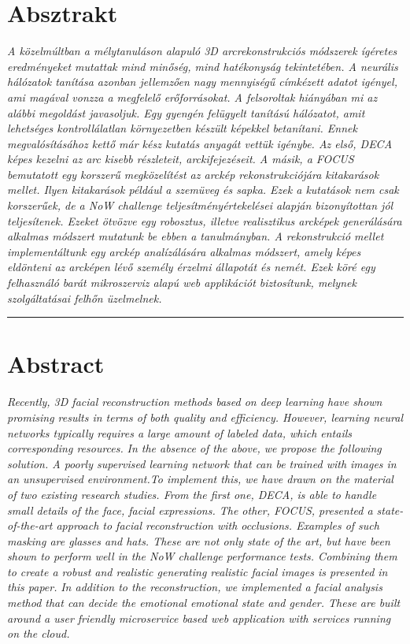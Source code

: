 \documentclass[12pt,a4]{article}
\begin{document}
	\section*{Absztrakt}
     \emph{
		A közelmúltban a mélytanuláson alapuló 3D arcrekonstrukciós módszerek
		ígéretes eredményeket mutattak mind minőség, mind hatékonyság tekintetében. A neurális hálózatok tanítása azonban jellemzően nagy mennyiségű címkézett
		adatot igényel, ami magával vonzza a megfelelő erőforrásokat.
		A felsoroltak hiányában mi az alábbi megoldást javasoljuk. Egy gyengén
		felügyelt tanítású hálózatot, amit lehetséges kontrollálatlan környezetben készült képekkel betanítani.
		Ennek megvalósításához kettő már kész kutatás anyagát vettük igénybe. Az
		első, \cite{deca}DECA képes kezelni az arc kisebb részleteit, arckifejezéseit. A
		másik, a \cite{focus}FOCUS bemutatott egy korszerű megközelítést az arckép rekonstrukciójára kitakarások mellet. Ilyen kitakarások például a szemüveg és sapka. Ezek a kutatások nem csak korszerűek, de a NoW challenge teljesítményértekelései alapján bizonyítottan jól teljesítenek. Ezeket ötvözve egy robosztus, illetve realisztikus
		arcképek generálására alkalmas módszert mutatunk be ebben a tanulmányban.
		A rekonstrukció mellet implementáltunk egy arckép analízálására alkalmas módszert, amely képes eldönteni az arcképen lévő személy érzelmi
		állapotát és nemét. Ezek köré egy felhasználó barát mikroszerviz alapú web
		applikációt biztosítunk, melynek szolgáltatásai felhőn üzelmelnek.
		}
	\par\noindent\rule{\textwidth}{0.4pt}

    \section*{Abstract}
        \textit{Recently, 3D facial reconstruction methods based on deep learning have shown promising results in terms of both quality and efficiency. However, learning neural networks typically requires a large amount of labeled data, which entails corresponding resources.
        }
        \textit{In the absence of the above, we propose the following solution. A poorly supervised learning network that can be trained with images in an unsupervised environment.To implement this, we have drawn on the material of two existing research studies. From the first one, \cite{deca}DECA, is able to handle small details of the face, facial expressions. The other, \cite{focus}FOCUS, presented a state-of-the-art approach to facial reconstruction with occlusions. Examples of such masking are glasses and hats. These are not only state of the art, but have been shown to perform well in the NoW challenge performance tests. Combining them to create a robust and realistic generating realistic facial images is presented in this paper.}
        \textit{In addition to the reconstruction, we implemented a facial analysis method that can decide the emotional emotional state and gender. These are built around a user friendly microservice based web application with services running on the cloud.}
     
\end{document}
